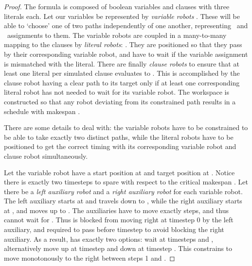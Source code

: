 \begin{proof}
	The formula \ilmath{\varphi} is composed of  boolean variables  and  clauses  with three literals each. Let our variables be represented by  \emph{variable robots} . These will be able to `choose' one of two paths independently of one another, representing \true\ and \false\ assignments to them. The variable robots are coupled in a many-to-many mapping to the clauses by  \emph{literal robots}: . They are positioned so that they pass by their corresponding variable robot, and have to wait if the variable assignment is mismatched with the literal. There are finally  \emph{clause robots} to ensure that at least one literal per simulated clause evaluates to \true. This is accomplished by the clause robot having a clear path to its target only if at least one corresponding literal robot has not needed to wait for its variable robot. The workspace is constructed so that any robot deviating from its constrained path results in a schedule with makespan .


	There are some details to deal with: the variable robots have to be constrained to be able to take exactly two distinct paths, while the literal robots have to be positioned to get the correct timing with its corresponding variable robot and clause robot simultaneously.

	Let the variable robot  have a start position at  and target position at . Notice there is exactly two timesteps to spare with respect to the critical makespan . Let there be a \emph{left auxiliary robot} and a \emph{right auxiliary robot} for each variable robot. The left auxiliary starts at  and travels down to , while the right auxiliary starts at , and moves up to . The auxiliaries have to move exactly  steps, and thus cannot wait for . Thus  is blocked from moving right at timestep 0 by the left auxiliary, and required to pass  before timestep  to avoid blocking the right auxiliary. As a result,  has exactly two options: wait at timesteps  and , alternatively move up at timestep  and down at timestep . This constrains  to move monotonously to the right between steps 1 and .


\end{proof}
